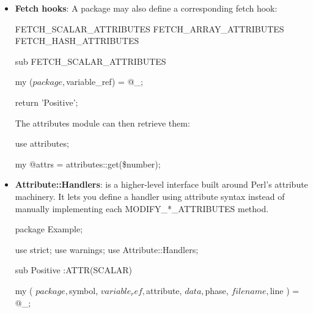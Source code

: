 \documentclass{report}
\begin{document}
\begin{itemize}
            \bigbreak \noindent 
            When Perl compiles the declaration, it approximately performs:
            \bigbreak \noindent 
            \begin{perlcode}
                Example->MODIFY_SCALAR_ATTRIBUTES(
                    \$number,
                    'Positive'
                );
            \end{perlcode}
            \bigbreak \noindent 
            The handler must return every attribute it did not recognize. If it returns an attribute, Perl reports an error
            \bigbreak \noindent 
            A handler that accepts everything can return an empty list
        \item \textbf{Fetch hooks}: A package may also define a corresponding fetch hook:
            \bigbreak \noindent 
            \begin{perlcode}
                FETCH_SCALAR_ATTRIBUTES
                FETCH_ARRAY_ATTRIBUTES
                FETCH_HASH_ATTRIBUTES
            \end{perlcode}
            \bigbreak \noindent 
            \begin{perlcode}
                sub FETCH_SCALAR_ATTRIBUTES {
                    my ($package, $variable_ref) = @_;

                    return 'Positive';
                }
            \end{perlcode}
            \bigbreak \noindent 
            The attributes module can then retrieve them:
            \bigbreak \noindent 
            \begin{perlcode}
                use attributes;

                my @attrs = attributes::get(\$number);
            \end{perlcode}
        \item \textbf{Attribute::Handlers}: is a higher-level interface built around Perl’s attribute machinery. It lets you define a handler using attribute syntax instead of manually implementing each MODIFY\_*\_ATTRIBUTES method.
            \bigbreak \noindent 
            \begin{perlcode}
            package Example;

            use strict;
            use warnings;
            use Attribute::Handlers;

            sub Positive :ATTR(SCALAR) {
                my (
                    $package,
                    $symbol,
                    $variable_ref,
                    $attribute,
                    $data,
                    $phase,
                    $filename,
                    $line
                ) = @_;

}
\end{perlcode}
\end{itemize}
\end{document}
